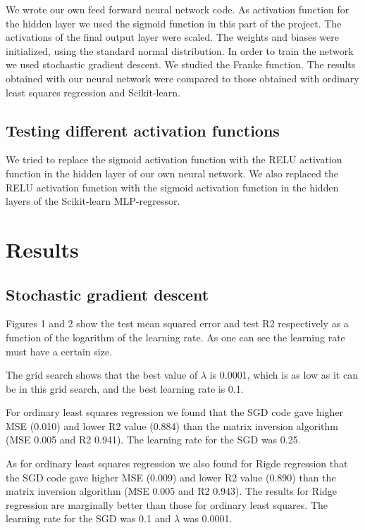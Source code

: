\documentclass[12pt,a4paper]{article}
\begin{document}
    We wrote our own feed forward neural network code. As activation function for the hidden layer we used the sigmoid function in this part of the project. The activations of the final output layer were scaled. The weights and biases were initialized, using the standard normal distribution. In order to train the network we used stochastic gradient descent.
    We studied the Franke function. The results obtained with our neural network were compared to those obtained with ordinary least squares regression and Scikit-learn.
    \subsection{Testing different activation functions}
    
    We tried to replace the sigmoid activation function with the RELU activation function  in the hidden layer of our own neural network. We also replaced the RELU activation function with the sigmoid activation function in the hidden layers of the Scikit-learn MLP-regressor.
    
\section{Results}
    \subsection{Stochastic gradient descent}

Figures 1 and 2 show the test mean squared error and test R2 respectively as a function of the logarithm of the learning rate. As one can see the learning rate must have a certain size.


The grid search shows that the best value of $\lambda$ is 0.0001, which is as low as it can be in this grid search, and the best learning rate is 0.1.


For ordinary least squares regression we found that the SGD code gave higher MSE (0.010) and lower R2 value (0.884) than the matrix inversion algorithm (MSE 0.005 and R2 0.941). The learning rate for the SGD was 0.25.


As for ordinary least squares regression we also found for Rigde regression that the SGD code gave higher MSE (0.009) and lower R2 value (0.890) than the matrix inversion algorithm (MSE 0.005 and R2 0.943). The results for Ridge regression are marginally better than those for ordinary least squares. The learning rate for the SGD was 0.1 and $\lambda$ was 0.0001.
\end{document}

